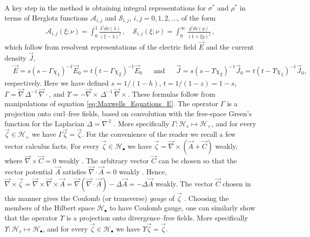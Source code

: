 \documentclass[english,12pt,jmp,graphicx]{revtex4-1}
\begin{document}
A key step in the method is obtaining integral representations for
$\sigma^*$ and $\rho^*$ in terms of Herglotz functions $\mathcal{A}_{i,j}$ and
$\mathcal{S}_{i,j}$, $i,j=0,1,2,\ldots$, of the form \cite{Henrici:1974:v3}  
%
\begin{align}\label{eq:Integral_Reps}
  \mathcal{A}_{i,j}(\xi;\nu)=\int_0^1\frac{\lambda^id\nu(\lambda)}{(\xi-\lambda)^j}\,, \quad  
  \mathcal{S}_{i,j}(\xi;\nu)=\int_0^\infty\frac{y^id\nu(y)}{(1+\xi y)^j}\,,
\end{align}
%
which follow from resolvent representations of the electric field
$\vec{E}$ and the current density $\vec{J}$,     
%
\begin{align}\label{eq:Resolvent_representations_E_D}
  &\vec{E}=s(s-\Gamma\chi_1)^{-1}\vec{E}_0=t(t-\Gamma\chi_2)^{-1}\vec{E}_0 &&\text{and}
  &&\vec{J}=s(s-\Upsilon\chi_2)^{-1}\vec{J}_0=t(t-\Upsilon\chi_1)^{-1}\vec{J}_0,
\end{align}
%
respectively. Here we have defined $s=1/(1-h)$,
$t=1/(1-z)=1-s$, $\Gamma=\vec{\nabla}\,\Delta^{-1}\,\vec{\nabla}\cdot$, and
$\Upsilon=-\vec{\nabla}\times\,\Delta^{-1}\,\vec{\nabla}\times$. These formulas follow from
manipulations of equation \eqref{eq:Maxwells_Equations_E}.
The operator $\Gamma$ is a projection onto curl--free fields, based on
convolution with the free-space Green's function for the Laplacian
$\Delta=\nabla^{\,2}$ \cite{Golden:CMP-473}. More specifically
$\Gamma:\mathscr{H}_s\mapsto\mathscr{H}_\times$, and for every 
$\vec{\zeta}\in\mathscr{H}_\times$ we have $\Gamma\vec{\zeta}=\vec{\zeta}$. 
For the convenience of the reader we recall a few vector calculus
facts. For every $\vec{\zeta}\in\mathscr{H}_\bullet$ we have
$\vec{\zeta}=\vec{\nabla}\times(\vec{A}+\vec{C})$ weakly, where $\vec{\nabla}\times\vec{C}=0$
weakly
\cite{Jackson-1999,Folland:95}.
The arbitrary vector $\vec{C}$
can be chosen so that the vector potential $\vec{A}$ satisfies $\vec{\nabla}\cdot\vec{A}=0$ weakly
\cite{Jackson-1999}. Hence, $\vec{\nabla}\times\vec{\zeta}=\vec{\nabla}\times\vec{\nabla}\times\vec{A}
=\vec{\nabla}(\vec{\nabla}\cdot\vec{A})-\Delta\vec{A}=-\Delta\vec{A}$ weakly. The vector
$\vec{C}$ chosen in this manner gives the Coulomb
(or transverse) \emph{gauge} of $\vec{\zeta}$ \cite{Jackson-1999}. Choosing the members of
the Hilbert space $\mathscr{H}_{\bullet}$ to have Coulomb gauge, one can 
similarly show that the operator $\Upsilon$ is a projection onto
divergence--free fields.
More specifically
$\Upsilon:\mathscr{H}_s\mapsto\mathscr{H}_\bullet$, and for every $\vec{\zeta}\in\mathscr{H}_\bullet$
we have $\Upsilon\vec{\zeta}=\vec{\zeta}$.   
\end{document}

